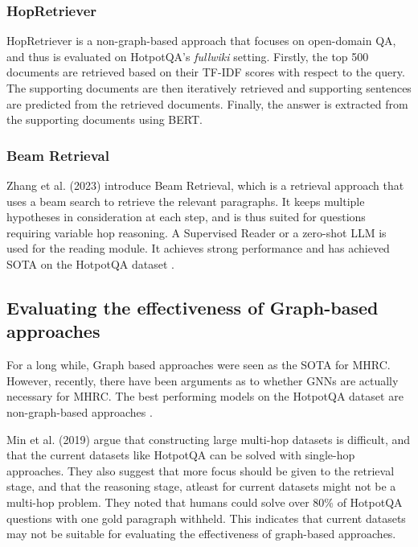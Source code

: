 \documentclass[sigplan,screen]{acmart}
\begin{document}
\subsubsection{HopRetriever}
HopRetriever \cite{RN149} is a non-graph-based approach that focuses on open-domain QA, and thus is evaluated on HotpotQA's \emph{fullwiki} 
setting. Firstly, the top 500 documents are retrieved based on their TF-IDF scores with respect to the query. The supporting documents
are then iteratively retrieved and supporting sentences are predicted from the retrieved documents. Finally, the answer is extracted 
from the supporting documents using BERT.

\subsubsection{Beam Retrieval}
 Zhang et al. (2023)\cite{RN105} introduce Beam Retrieval, which is a retrieval approach that uses a beam search to retrieve the relevant 
 paragraphs. It keeps multiple hypotheses in consideration at each step, and is thus suited for questions requiring variable hop reasoning. 
 A Supervised Reader or a zero-shot LLM is used for the reading module. It achieves strong performance and has achieved SOTA on the 
 HotpotQA dataset \cite{RN116}.


\subsection{Evaluating the effectiveness of Graph-based approaches}

For a long while, Graph based approaches were seen as the SOTA for MHRC. However, recently, there have been arguments as to whether GNNs 
are actually necessary for MHRC. The best performing models on the HotpotQA dataset \cite{RN116} are non-graph-based approaches \cite{RN105} 
\cite{RN149}.

Min et al. (2019) \cite{RN150} argue that constructing large multi-hop datasets is difficult, and that the current datasets like HotpotQA can 
be solved with single-hop approaches. They also suggest that more focus should be given to the retrieval stage, and that the reasoning stage, 
atleast for current datasets might not be a multi-hop problem. They noted that humans could solve over 80\% of HotpotQA questions with one 
gold paragraph withheld. This indicates that current datasets may not be suitable for evaluating the effectiveness of graph-based approaches.
\end{document}

